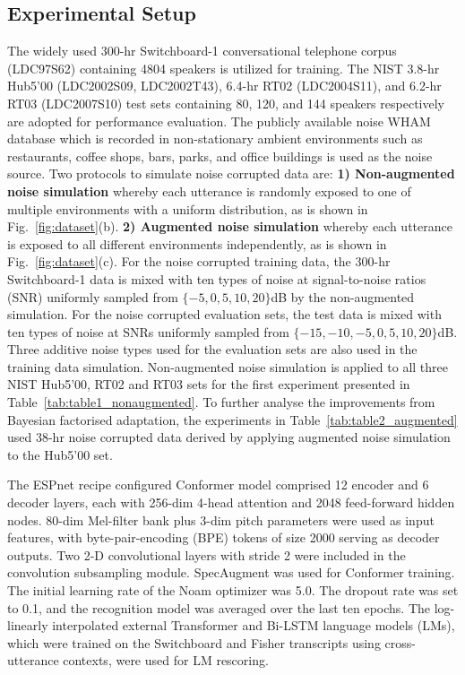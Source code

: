 \documentclass{INTERSPEECH2023}
\begin{document}
\subsection{Experimental Setup}
\label{sec.expsetup}
The widely used 300-hr Switchboard-1 conversational telephone corpus (LDC97S62)\cite{godfrey1992switchboard} containing 4804 speakers is utilized for training. The NIST 3.8-hr Hub5'00 (LDC2002S09, LDC2002T43), 6.4-hr RT02 (LDC2004S11), and 6.2-hr RT03 (LDC2007S10) test sets containing 80, 120, and 144 speakers respectively are adopted for performance evaluation. The publicly available noise WHAM database \cite{Wichern2019WHAM} which is recorded in non-stationary ambient environments such as restaurants, coffee shops, bars, parks, and office buildings is used as the noise source. Two protocols to simulate noise corrupted data are: {\bf 1) Non-augmented noise simulation} whereby each utterance is randomly exposed to one of multiple environments with a uniform distribution, as is shown in Fig.~\ref{fig:dataset}(b). {\bf 2) Augmented noise simulation} whereby each utterance is exposed to all different environments independently, as is shown in Fig.~\ref{fig:dataset}(c). For the noise corrupted training data, the 300-hr Switchboard-1 data is mixed with ten types of noise at signal-to-noise ratios (SNR) uniformly sampled from $\{-5, 0, 5, 10, 20\}$dB by the non-augmented simulation. For the noise corrupted evaluation sets, the test data is mixed with ten types of noise at SNRs uniformly sampled from $\{-15, -10, -5, 0, 5, 10, 20\}$dB. Three additive noise types used for the evaluation sets are also used in the training data simulation. Non-augmented noise simulation is applied to all three NIST Hub5'00, RT02 and RT03 sets for the first experiment presented in Table~\ref{tab:table1_nonaugmented}. 
To further analyse the improvements from Bayesian factorised adaptation, the experiments in Table~\ref{tab:table2_augmented} used 38-hr noise corrupted data derived by applying augmented noise simulation to the Hub5'00 set.

The ESPnet recipe \cite{guo2021recent} configured Conformer model comprised 12 encoder and 6 decoder layers, each with 256-dim 4-head attention and 2048 feed-forward hidden nodes. 80-dim Mel-filter bank plus 3-dim pitch parameters were used as input features, with byte-pair-encoding (BPE) tokens of size 2000 serving as decoder outputs. Two 2-D convolutional layers with stride 2 were included in the convolution subsampling module. 
SpecAugment \cite{Park2019SpecAugmentAS} was used for Conformer training. The initial learning rate of the Noam optimizer was 5.0. The dropout rate was set to 0.1, and the recognition model was averaged over the last ten epochs. The log-linearly interpolated external Transformer and Bi-LSTM language models (LMs), which were trained on the Switchboard and Fisher transcripts using cross-utterance contexts\cite{Sun2021TransformerLM}, were used for LM rescoring.
\end{document}
